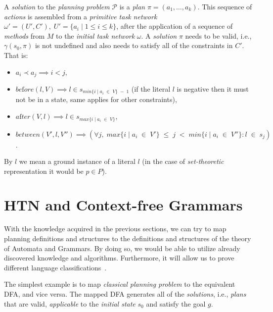 \begin{defn}\label{def02:13}
    A \emph{solution} to the \emph{planning problem} $\mathcal{P}$ is a \emph{plan} $\pi=(a_1,\dots,a_k)$. This sequence of \emph{actions} is assembled from a \emph{primitive task network} $\omega'=(U', C'), \; U' = 
 \{a_i \; | \; 1 \leq i \leq k\}$, after the application of a sequence of \emph{methods} from $M$ to the \emph{initial task network} $\omega$. A \emph{solution} $\pi$ needs to be valid, i.e., $\gamma(s_0,\pi)$ is not undefined and also needs to satisfy all of the constraints in $C'$. That is:
    
    \begin{itemize}
        \item $a_i \prec a_j \implies i < j$,
        
        \item $be\text{f}ore(l, V) \implies l \in s_{min\{i \; | \; a_i \; \in \; V\} \; - \; 1}$ (if the literal $l$ is negative then it must not be in a state, same applies for other constraints),
        
        \item $a\text{f}ter(V,l) \implies l \in s_{max\{i \; | \; a_i \; \in \; V\}}$,
        
        \item $between(V',l,V'') \implies (\forall j, \; max\{i \; | \; a_i \; \in \; V'\} \; \leq \; j \; < \; min\{i \; | \; a_i \; \in \; V''\}: l \; \in \; s_j)$.
    \end{itemize}
    
    By $l$ we mean a ground instance of a literal $l$ (in the case of \emph{set-theoretic} representation it would be $p \in P$).
\end{defn}

\section{HTN and Context-free Grammars}

\medskip\noindent
With the knowledge acquired in the previous sections, we can try to map planning definitions and structures to the definitions and structures of the theory of Automata and Grammars. By doing so, we would be able to utilize already discovered knowledge and algorithms. Furthermore, it will allow us to prove different language classifications~\cite{langclassification}.

\medskip\noindent
The simplest example is to map \emph{classical planning problem} to the equivalent DFA, and vice versa. The mapped DFA generates all of the \emph{solutions}, i.e., \emph{plans} that are valid, \emph{applicable} to the \emph{initial state} $s_0$ and satisfy the goal $g$.

